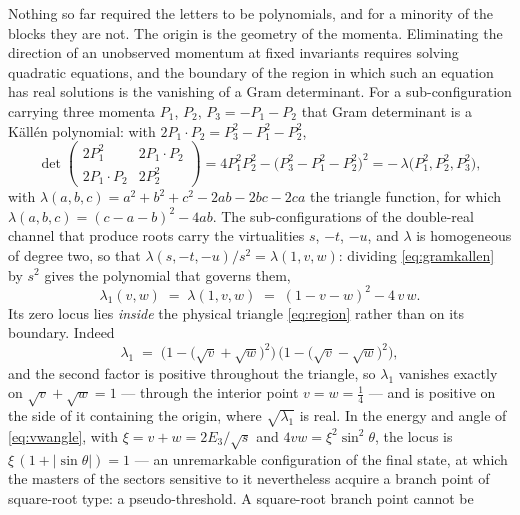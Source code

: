 \documentclass[11pt]{article}
\begin{document}
Nothing so far required the letters to be polynomials, and for a
minority of the blocks they are not.  The origin is the geometry of
the momenta.  Eliminating the direction of an unobserved momentum at
fixed invariants requires solving quadratic equations, and the
boundary of the region in which such an equation has real solutions
is the vanishing of a Gram determinant.  For a sub-configuration
carrying three momenta $P_1$, $P_2$, $P_3 = -P_1-P_2$ that Gram
determinant is a K\"all\'en polynomial: with
$2P_1\!\cdot\!P_2 = P_3^2 - P_1^2 - P_2^2$,
\begin{equation}
  \det\begin{pmatrix}
    2P_1^2 & 2P_1\!\cdot\!P_2\\
    2P_1\!\cdot\!P_2 & 2P_2^2
  \end{pmatrix}
  = 4P_1^2P_2^2 - \big(P_3^2-P_1^2-P_2^2\big)^2
  = -\,\lambda\big(P_1^2, P_2^2, P_3^2\big) ,
  \label{eq:gramkallen}
\end{equation}
with $\lambda(a,b,c) = a^2+b^2+c^2-2ab-2bc-2ca$ the triangle
function, for which $\lambda(a,b,c) = (c-a-b)^2 - 4ab$.  The
sub-configurations of the double-real channel that produce roots
carry the virtualities $s$, $-t$, $-u$, and $\lambda$ is homogeneous
of degree two, so that
$\lambda(s,-t,-u)/s^2 = \lambda(1,v,w)$: dividing
\eqref{eq:gramkallen} by $s^2$ gives the polynomial that governs
them,
\begin{equation}
  \lambda_1(v,w) \;=\; \lambda(1, v, w)
  \;=\; (1 - v - w)^2 - 4\,v\,w .
  \label{eq:kallen}
\end{equation}
Its zero locus lies \emph{inside} the physical triangle
\eqref{eq:region} rather than on its boundary.  Indeed
\begin{equation}
  \lambda_1 \;=\;
  \Big(1 - \big(\sqrt v + \sqrt w\big)^2\Big)\,
  \Big(1 - \big(\sqrt v - \sqrt w\big)^2\Big) ,
  \label{eq:kallenfactored}
\end{equation}
and the second factor is positive throughout the triangle, so
$\lambda_1$ vanishes exactly on $\sqrt v + \sqrt w = 1$ --- through
the interior point $v = w = \tfrac14$ --- and is positive on the side
of it containing the origin, where $\sqrt{\lambda_1}$ is real.  In
the energy and angle of \eqref{eq:vwangle}, with
$\xi = v+w = 2E_3/\sqrt s$ and $4vw = \xi^2\sin^2\theta$, the locus is
$\xi\,(1+\lvert\sin\theta\rvert) = 1$ --- an unremarkable
configuration of the final state, at which the masters of the sectors
sensitive to it nevertheless acquire a branch point of square-root
type: a pseudo-threshold.  A square-root branch point cannot be
\end{document}
